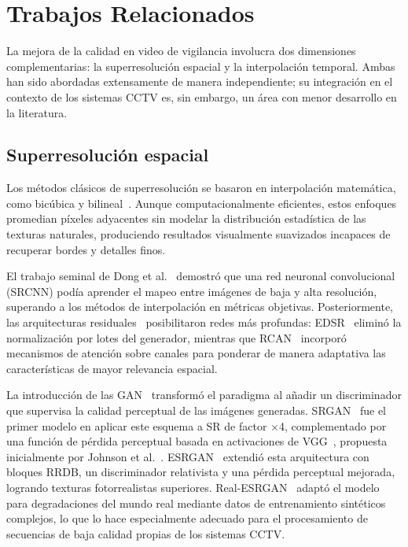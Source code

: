 \documentclass[conference]{IEEEtran}
\begin{document}
\section{Trabajos Relacionados}

La mejora de la calidad en video de vigilancia involucra dos dimensiones complementarias: la superresolución espacial y la interpolación temporal. Ambas han sido abordadas extensamente de manera independiente; su integración en el contexto de los sistemas CCTV es, sin embargo, un área con menor desarrollo en la literatura.

\subsection{Superresolución espacial}

Los métodos clásicos de superresolución se basaron en interpolación matemática, como bicúbica y bilineal~\cite{vanouwerkerk2006survey}. Aunque computacionalmente eficientes, estos enfoques promedian píxeles adyacentes sin modelar la distribución estadística de las texturas naturales, produciendo resultados visualmente suavizados incapaces de recuperar bordes y detalles finos.

El trabajo seminal de Dong et al.~\cite{dong2014srcnn} demostró que una red neuronal convolucional (SRCNN) podía aprender el mapeo entre imágenes de baja y alta resolución, superando a los métodos de interpolación en métricas objetivas. Posteriormente, las arquitecturas residuales~\cite{he2016resnet} posibilitaron redes más profundas: EDSR~\cite{lim2017edsr} eliminó la normalización por lotes del generador, mientras que RCAN~\cite{zhang2018rcan} incorporó mecanismos de atención sobre canales para ponderar de manera adaptativa las características de mayor relevancia espacial.

La introducción de las GAN~\cite{goodfellow2014gan} transformó el paradigma al añadir un discriminador que supervisa la calidad perceptual de las imágenes generadas. SRGAN~\cite{ledig2017srgan} fue el primer modelo en aplicar este esquema a SR de factor $\times$4, complementado por una función de pérdida perceptual basada en activaciones de VGG~\cite{simonyan2015vgg}, propuesta inicialmente por Johnson et al.~\cite{johnson2016perceptual}. ESRGAN~\cite{wang2018esrgan} extendió esta arquitectura con bloques RRDB, un discriminador relativista y una pérdida perceptual mejorada, logrando texturas fotorrealistas superiores. Real-ESRGAN~\cite{wang2021realesrgan} adaptó el modelo para degradaciones del mundo real mediante datos de entrenamiento sintéticos complejos, lo que lo hace especialmente adecuado para el procesamiento de secuencias de baja calidad propias de los sistemas CCTV.
\end{document}
